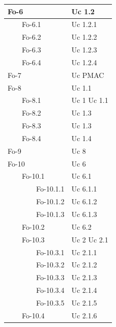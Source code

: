 \documentclass[10pt,a4paper]{article}
\begin{document}
\begin{longtable}{|p{5cm}|p{5cm}|}
\hline
Fo-6 & Uc 1.2\\
\hline
\ \ \ \ Fo-6.1 & Uc 1.2.1\\
\hline
\ \ \ \ Fo-6.2 & Uc 1.2.2\\
\hline
\ \ \ \ Fo-6.3 & Uc 1.2.3\\
\hline
\ \ \ \ Fo-6.4 & Uc 1.2.4\\
\hline
Fo-7 & Uc PMAC\\
\hline
Fo-8 & Uc 1.1\\
\hline
\ \ \ \ Fo-8.1 & Uc 1 \newline Uc 1.1\\
\hline
\ \ \ \ Fo-8.2 & Uc 1.3\\
\hline
\ \ \ \ Fo-8.3 & Uc 1.3\\
\hline
\ \ \ \ Fo-8.4 & Uc 1.4\\
\hline
Fo-9 & Uc 8\\
\hline
Fo-10 & Uc 6\\
\hline
\ \ \ \ Fo-10.1 & Uc 6.1\\
\hline
\ \ \ \ \ \ \ \ Fo-10.1.1 & Uc 6.1.1\\
\hline
\ \ \ \ \ \ \ \ Fo-10.1.2 & Uc 6.1.2\\
\hline
\ \ \ \ \ \ \ \ Fo-10.1.3 & Uc 6.1.3\\
\hline
\ \ \ \ Fo-10.2 & Uc 6.2\\
\hline
\ \ \ \ Fo-10.3 & Uc 2 \newline Uc 2.1\\
\hline
\ \ \ \ \ \ \ \ Fo-10.3.1 & Uc 2.1.1\\
\hline
\ \ \ \ \ \ \ \ Fo-10.3.2 & Uc 2.1.2\\
\hline
\ \ \ \ \ \ \ \ Fo-10.3.3 & Uc 2.1.3\\
\hline
\ \ \ \ \ \ \ \ Fo-10.3.4 & Uc 2.1.4\\
\hline
\ \ \ \ \ \ \ \ Fo-10.3.5 & Uc 2.1.5\\
\hline
\ \ \ \ Fo-10.4 & Uc 2.1.6\\

\end{longtable}

\end{document}
